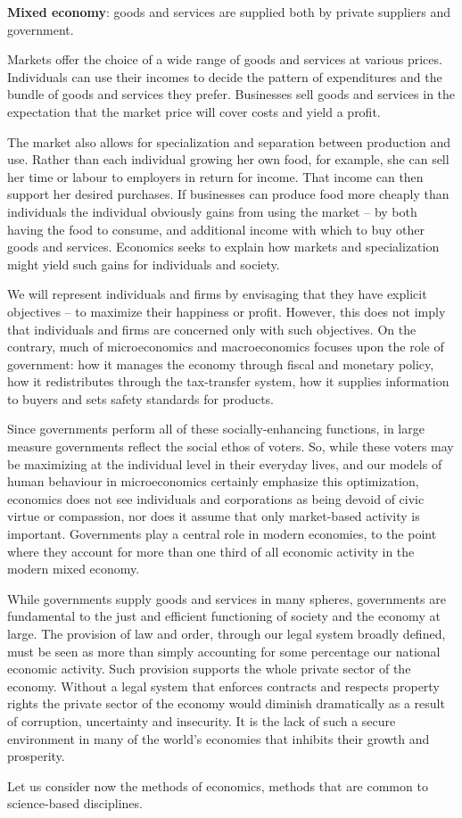 \begin{DefBox}
\textbf{Mixed economy}: goods and services are supplied both by private suppliers and government.
\end{DefBox}

Markets offer the choice of a wide range of goods and services at various prices. Individuals can use their incomes to decide the pattern of expenditures and the bundle of goods and services they prefer. Businesses sell goods and services in the expectation that the market price will cover costs and yield a profit. 

The market also allows for specialization and separation between production and use. Rather than each individual growing her own food, for example, she can sell her time or labour to employers in return for income. That income can then support her desired purchases. If businesses can produce food more cheaply than individuals the individual obviously gains from using the market -- by both having the food to consume, and additional income with which to buy other goods and services. Economics seeks to explain how markets and specialization might yield such gains for individuals and society.

We will represent individuals and firms by envisaging that they have explicit objectives -- to maximize their happiness or profit. However, this does not imply that individuals and firms are concerned only with such objectives. On the contrary, much of microeconomics and macroeconomics focuses upon the role of government: how it manages the economy through fiscal and monetary policy, how it redistributes through the tax-transfer system, how it supplies information to buyers and sets safety standards for products. 

Since governments perform all of these socially-enhancing functions, in large measure governments reflect the social ethos of voters. So, while these voters may be maximizing at the individual level in their everyday lives, and our models of human behaviour in microeconomics certainly emphasize this optimization, economics does not see individuals and corporations as being devoid of civic virtue or compassion, nor does it assume that only market-based activity is important. Governments play a central role in modern economies, to the point where they account for more than one third of all economic activity in the modern mixed economy. 

While governments supply goods and services in many spheres, governments are fundamental to the just and efficient functioning of society and the economy at large. The provision of law and order, through our legal system broadly defined, must be seen as more than simply accounting for some percentage our national economic activity. Such provision supports the whole private sector of the economy. Without a legal system that enforces contracts and respects property rights the private sector of the economy would diminish dramatically as a result of corruption, uncertainty and insecurity. It is the lack of such a secure environment in many of the world's economies that inhibits their growth and prosperity.

Let us consider now the methods of economics, methods that are common to science-based disciplines.
